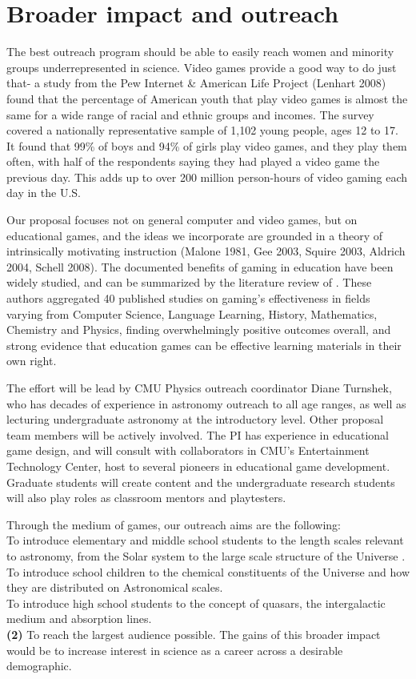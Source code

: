 \section{Broader impact and outreach}

The best outreach program should be able to easily reach women and
minority groups underrepresented in science. Video games provide
a good way to do just that- a  study from the  Pew Internet 
\& American Life 
Project (Lenhart 2008) found that the percentage of American youth
that play video games is almost the same for a wide range of racial and
ethnic groups and incomes. The survey covered a
 nationally representative sample of 1,102 young people, ages 12 to 
17. It found that 99\% of boys and 94\% of girls
play video games, and they play them often, with  half of the respondents 
saying they had played a video game the previous day. This adds up to
over 200 million person-hours of video gaming each day in the U.S.

Our proposal 
focuses not on general computer and video games, but on educational games,
and the ideas we incorporate are 
grounded in a theory of intrinsically motivating instruction 
(Malone 1981, Gee 2003,
Squire 2003, Aldrich 2004, Schell 2008). The documented benefits of gaming
in education have been widely studied, and can be summarized by the 
literature review of \cite{Backlund}. These authors aggregated 40 published
studies on 
gaming's effectiveness in fields varying from Computer Science, 
Language Learning, History, Mathematics, Chemistry and Physics, finding 
overwhelmingly positive outcomes overall, and strong evidence that 
education games can be effective learning materials in their own right.

The effort will be lead by CMU Physics outreach coordinator Diane 
Turnshek, who has decades of
experience in astronomy outreach to all age ranges, as well
as lecturing undergraduate astronomy at the introductory level.
Other proposal team members will be actively involved. The PI has
experience in educational game design, and will consult with collaborators
in CMU's Entertainment Technology Center, host to several pioneers in 
educational game development. Graduate students will create content
and the undergraduate research students will also play roles
as  classroom mentors and playtesters.




Through the medium of  games, our outreach aims are the following:\\
 To introduce  elementary and middle
school students to the length scales relevant
to astronomy, from the Solar system to the large scale structure of the Universe
.\\
  To introduce school children to the chemical constituents
 of the Universe and how they are distributed on Astronomical scales.\\
 To introduce high school students to the concept
of quasars, the  intergalactic medium and absorption lines.\\
{\bf (2)}
To reach the largest audience possible. 
 The gains of this broader 
impact would be to increase interest in science as a career across 
a desirable demographic.


